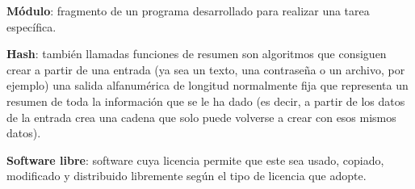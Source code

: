 \textbf{Módulo}: fragmento de un programa desarrollado para realizar una tarea específica.
\bigskip

\textbf{Hash}: también llamadas funciones de resumen son algoritmos que consiguen crear a partir de una entrada (ya sea un texto, una contraseña o un archivo, por ejemplo) una salida alfanumérica de longitud normalmente fija que representa un resumen de toda la información que se le ha dado (es decir, a partir de los datos de la entrada crea una cadena que solo puede volverse a crear con esos mismos datos).
\bigskip

\textbf{Software libre}: software cuya licencia permite que este sea usado, copiado, modificado y distribuido libremente según el tipo de licencia que adopte.
\bigskip
